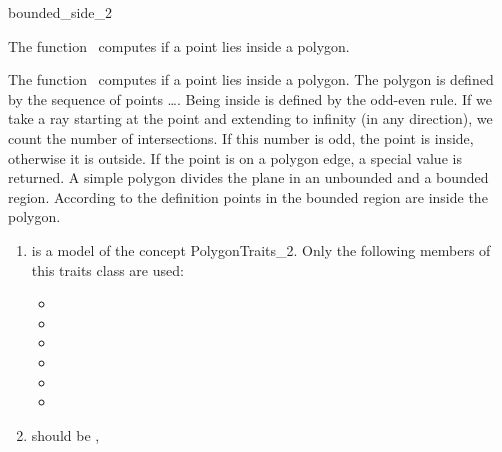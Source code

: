 

\begin{ccRefFunction}{bounded_side_2}  %


\ccDefinition

The function \ccRefName\ computes if a point lies inside a polygon.


{
The function \ccRefName\ computes if a point lies inside a polygon. 
The polygon is defined by the sequence of points \ldots {}.
Being inside is defined by the odd-even rule. If we take a ray starting at the
point and extending to infinity (in any direction), we count the number of
intersections. If this number is odd, the point is inside, otherwise it is
outside. If the point is on a polygon edge, a special value is returned.  A
simple polygon divides the plane in an unbounded and a bounded region.
According to the definition points in the bounded region are inside the polygon.
}

\begin{enumerate}
    \item {} is a model of the concept 
	  PolygonTraits\_2.
	  Only the following members of this traits class are used:
          \begin{itemize}
            \item {}
            \item {}
            \item {}
            \item {}
            \item {}
            \item {}
          \end{itemize}
    \item {} should be ,
\end{enumerate}


\end{ccRefFunction}
